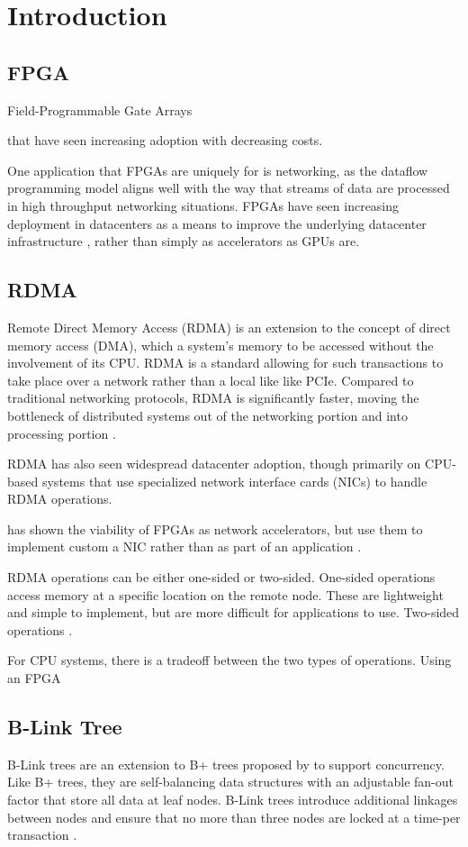 \section{Introduction}

\subsection{FPGA}

Field-Programmable Gate Arrays

that have seen increasing adoption with decreasing costs.

One application that FPGAs are uniquely for is networking, as the dataflow programming model aligns well with the way that streams of data are processed in high throughput networking situations. FPGAs have seen increasing deployment in datacenters as a means to improve the underlying datacenter infrastructure \todocite, rather than simply as accelerators as GPUs are.


\subsection{RDMA}

Remote Direct Memory Access (RDMA) is an extension to the concept of direct memory access (DMA), which a system's memory to be accessed without the involvement of its CPU. RDMA is a standard allowing for such transactions to take place over a network rather than a local like like PCIe. Compared to traditional networking protocols, RDMA is significantly faster, moving the bottleneck of distributed systems out of the networking portion and into processing portion \cite{binnig-vldb-2016}.

RDMA has also seen widespread datacenter adoption, though primarily on CPU-based systems that use specialized network interface cards (NICs) to handle RDMA operations.

\citet{star} has shown the viability of FPGAs as network accelerators, but \citeauthor{star} use them to implement custom a NIC rather than as part of an application \cite{star}.

RDMA operations can be either one-sided or two-sided. One-sided operations access memory at a specific location on the remote node. These are lightweight and simple to implement, but are more difficult for applications to use. Two-sided operations  \cite{base}.

For CPU systems, there is a tradeoff between the two types of operations. Using an FPGA


\subsection{B-Link Tree}

B-Link trees are an extension to B+ trees proposed by \citeauthor{b-link} to support concurrency. Like B+ trees, they are self-balancing data structures with an adjustable fan-out factor that store all data at leaf nodes. B-Link trees introduce additional linkages between nodes and ensure that no more than three nodes are locked at a time-per transaction \cite{b-link}.
